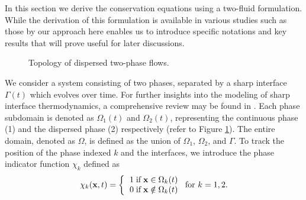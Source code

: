 In this section we derive the conservation equations using a two-fluid formulation.
While the derivation of this formulation is available in various studies such as those by \citet{kataoka1986local,lhuillier2010multiphase,ishii2010thermo,morel2015mathematical} our approach here enables us to introduce specific notations and key results that will prove useful for later discussions. %
\begin{figure}[h!]
    \centering
    \caption{Topology of dispersed two-phase flows.}%
    \label{fig:Scheme}
\end{figure}

We consider a system consisting of two phases, separated by a sharp interface $\Gamma(t)$ which evolves over time. 
For further insights into the modeling of sharp interface thermodynamics, a comprehensive review may be found in \cite{bothe2022sharp}. 
Each phase subdomain is denoted as $\Omega_1(t)$ and $\Omega_2(t)$, representing the continuous phase (1) and the dispersed phase (2) respectively (refer to Figure \ref{fig:Scheme}).
The entire domain, denoted as $\Omega$, is defined as the union of $\Omega_1$, $\Omega_2$, and $\Gamma$.
To track the position of the phase indexed $k$ and the interfaces, we introduce the phase indicator function $\chi _k$ defined as
\begin{align}
    \chi_k(\textbf{x},t) =  \left\{
      \begin{tabular}{cc}
        $1 \;\text{if} \;\textbf{x} \in \Omega_k(t)$\\
        $0 \;\text{if} \;\textbf{x} \notin \Omega_k(t)$
      \end{tabular}
      \right.
      \text{for $k = 1,2$}.
      \label{eq:PIF}
\end{align}


